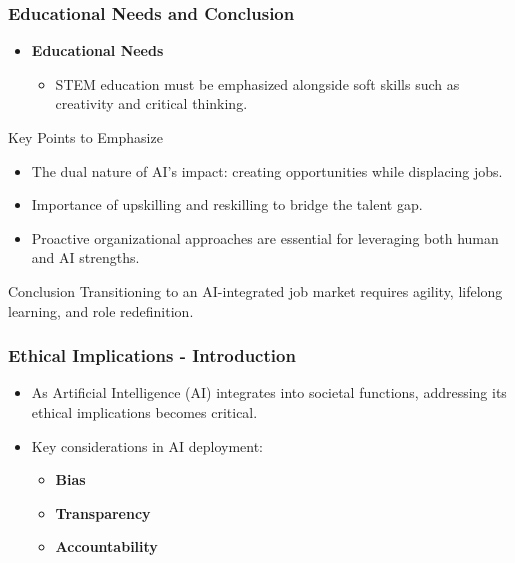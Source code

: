 \documentclass[aspectratio=169]{beamer}
\begin{document}
\begin{frame}[fragile]
    \frametitle{Educational Needs and Conclusion}

    \begin{itemize}
        \item \textbf{Educational Needs}
        \begin{itemize}
            \item STEM education must be emphasized alongside soft skills such as creativity and critical thinking.
        \end{itemize}
    \end{itemize}

    \begin{block}{Key Points to Emphasize}
        \begin{itemize}
            \item The dual nature of AI's impact: creating opportunities while displacing jobs.
            \item Importance of upskilling and reskilling to bridge the talent gap.
            \item Proactive organizational approaches are essential for leveraging both human and AI strengths.
        \end{itemize}
    \end{block}

    \begin{block}{Conclusion}
        Transitioning to an AI-integrated job market requires agility, lifelong learning, and role redefinition.
    \end{block}
\end{frame}

\begin{frame}[fragile]
    \frametitle{Ethical Implications - Introduction}
    \begin{itemize}
        \item As Artificial Intelligence (AI) integrates into societal functions, addressing its ethical implications becomes critical.
        \item Key considerations in AI deployment:
        \begin{itemize}
            \item \textbf{Bias}
            \item \textbf{Transparency}
            \item \textbf{Accountability}
        \end{itemize}
    \end{itemize}
\end{frame}
\end{document}
